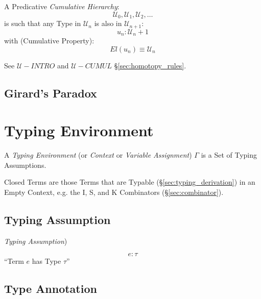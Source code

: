 A Predicative \emph{Cumulative Hierarchy}:
\[
  \mathcal{U}_0, \mathcal{U}_1, \mathcal{U}_2, \ldots
\]
is such that any Type in $\mathcal{U}_n$ is also in
$\mathcal{U}_{n+1}$:
\[
  u_n:\mathcal{U}_n+1
\]
with (Cumulative Property):
\[
  El(u_n) \equiv \mathcal{U}_n
\]

See $\mathcal{U}-INTRO$ and $\mathcal{U}-CUMUL$
\S\ref{sec:homotopy_rules}.



\subsection{Girard's Paradox}\label{sec:girards_paradox}



\section{Typing Environment}\label{sec:typing_environment}

A \emph{Typing Environment} (or \emph{Context} or \emph{Variable
  Assignment}) $\Gamma$ is a Set of Typing Assumptions.

Closed Terms are those Terms that are Typable
(\S\ref{sec:typing_derivation}) in an Empty Context, e.g. the I, S,
and K Combinators (\S\ref{sec:combinator}).



\subsection{Typing Assumption}\label{sec:typing_assumption}

\emph{Typing Assumption})

\[
  e : \tau
\]
``Term $e$ has Type $\tau$''



\subsection{Type Annotation}\label{sec:type_annotation}

